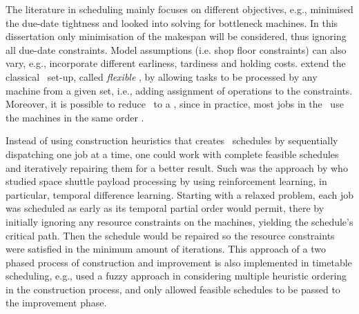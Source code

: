 The literature in scheduling mainly focuses on different objectives, 
e.g., \citet{Chang96} minimised the due-date tightness and 
\citet{Drobouchevitch2000,Gao2007} looked into solving for bottleneck machines. 
In this dissertation only minimisation of the makespan will be considered, thus 
ignoring all due-date constraints. 
Model assumptions (i.e. shop floor constraints) can also vary, e.g., 
\citet{Thiagarajan05} incorporate different earliness, tardiness and holding 
costs. 
\citet{Brandimarte1993,Xia2005,Pezzella2008} extend the classical \JSP\ set-up, 
called \emph{flexible} \jsp, by allowing tasks to be processed by any machine 
from a given set, i.e., adding assignment of operations to the constraints.
Moreover, it is possible to reduce \JSP\ to a \FSP, since in practice, 
most jobs in the \jsp\ use the machines in the same order 
\citep{Guinet1998,Ho2007}.

Instead of using construction heuristics that creates \jsp\ schedules by sequentially dispatching one job at a time, one could work with complete feasible schedules and iteratively repairing them for a better result. Such was the approach by \cite{Zhang95} who studied space shuttle payload processing by using reinforcement learning, in particular, temporal difference learning. Starting with a relaxed problem, each job was scheduled as early as its temporal partial order would permit, there by initially ignoring any resource constraints on the machines, yielding the schedule's critical path. Then the schedule would be repaired so the resource constraints were satisfied in the minimum amount of iterations.
This approach of a two phased process of construction and improvement is also implemented in timetable scheduling, e.g., \citet{Asmuni09} used a fuzzy approach in considering multiple heuristic ordering in the construction process, and only allowed feasible schedules to be passed to the improvement phase. 


